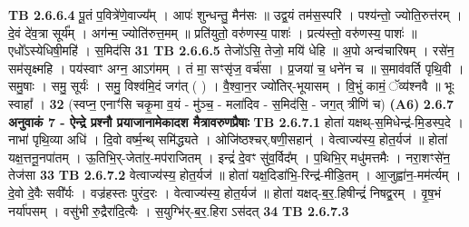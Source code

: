 \documentclass[17pt]{extarticle}
\begin{document}
                  \newline
                                \textbf{ TB 2.6.6.4} \newline
                  पू॒तं प॒वित्रे॑णे॒वाज्य᳚म् । आपः॑ शुन्धन्तु॒ मैन॑सः ॥ उद्व॒यं तम॑स॒स्परि॑ । पश्य॑न्तो॒ ज्योति॒रुत्त॑रम् । दे॒वं दे॑व॒त्रा सूर्य᳚म् । अग॑न्म॒ ज्योति॑रुत्त॒मम् ॥ प्रति॑युतो॒ वरु॑णस्य॒ पाशः॑ । प्रत्य॑स्तो॒ वरु॑णस्य॒ पाशः॑ ॥ एधो᳚ऽस्येधिषी॒महि॑ । स॒मिद॑सि \textbf{ 31} \newline
                  \newline
                                \textbf{ TB 2.6.6.5} \newline
                  तेजो॑ऽसि॒ तेजो॒ मयि॑ धेहि ॥ अ॒पो अन्व॑चारिषम् । रसे॑न॒ सम॑सृक्ष्महि । पय॑स्वाꣳ अग्न॒ आऽग॑मम् । तं मा॒ सꣳसृ॑ज॒ वर्च॑सा । प्र॒जया॑ च॒ धने॑न च ॥ स॒माव॑वर्ति पृथि॒वी । समु॒षाः । समु॒ सूर्यः॑ । समु॒ विश्व॑मि॒दं जग॑त् ( ) । वै॒श्वा॒न॒र ज्यो॑तिर्-भूयासम् । वि॒भुं कामं॒ ॅव्य॑श्नवै ॥ भूः स्वाहा᳚ । \textbf{ 32} \newline
                  \newline
                                    (स्वप्न॒ एनाꣳ॑सि चकृ॒मा व॒यं - मु॑ञ्च॒ - मला॑दिव - स॒मिद॑सि॒ - जग॒त् त्रीणि॑ च) \textbf{(A6)} \newline \newline
                \textbf{ 2.6.7     अनुवाकं   7 - ऐन्द्रे प्रश्नौ प्रयाजानामेकादश मैत्रावरुणप्रैषाः} \newline
                                \textbf{ TB 2.6.7.1} \newline
                  होता॑ यक्षथ्-स॒मिधेन्द्र॑-मि॒डस्प॒दे । नाभा॑ पृथि॒व्या अधि॑ । दि॒वो वर्ष्म॒न्थ् समि॑द्ध्यते । ओजि॑ष्ठश्चर्.षणी॒सहान्॑ । वेत्वाज्य॑स्य॒ होत॒र्यज॑ ॥ होता॑ यक्ष॒त्तनू॒नपा॑तम् । ऊ॒तिभि॒र्-जेता॑र॒-मप॑राजितम् । इन्द्रं॑ दे॒वꣳ सु॑व॒र्विद᳚म् । प॒थिभि॒र् मधु॑मत्तमैः । नरा॒शꣳसे॑न॒ तेज॑सा \textbf{ 33} \newline
                  \newline
                                \textbf{ TB 2.6.7.2} \newline
                  वेत्वाज्य॑स्य॒ होत॒र्यज॑ ॥ होता॑ यक्ष॒दिडा॑भि॒-रिन्द्र॑-मीडि॒तम् । आ॒जुह्वा॑न॒-मम॑र्त्यम् । दे॒वो दे॒वैः सवी᳚र्यः । वज्र॑हस्तः पुरंद॒रः । वेत्वाज्य॑स्य॒ होत॒र्यज॑ ॥ होता॑ यक्षद्-ब॒र॒.हिषीन्द्रं॑ निषद्व॒रम् । वृ॒ष॒भं नर्या॑पसम् । वसु॑भी रु॒द्रैरा॑दि॒त्यैः । स॒युग्भि॑र्-ब॒र॒.हिरा ऽस॑दत् \textbf{ 34} \newline
                  \newline
                                \textbf{ TB 2.6.7.3} \newline
\end{document}
